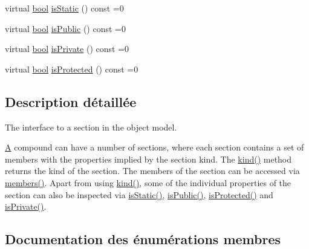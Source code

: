 \begin{DoxyCompactItemize}
\item 
virtual \hyperlink{qglobal_8h_a1062901a7428fdd9c7f180f5e01ea056}{bool} \hyperlink{class_i_section_aff6aeaf9972edac9b11fe09d74e58c5d}{is\+Static} () const  =0
\item 
virtual \hyperlink{qglobal_8h_a1062901a7428fdd9c7f180f5e01ea056}{bool} \hyperlink{class_i_section_aac1342e8d3db6be3fb5dada6a06bcdb3}{is\+Public} () const  =0
\item 
virtual \hyperlink{qglobal_8h_a1062901a7428fdd9c7f180f5e01ea056}{bool} \hyperlink{class_i_section_a5a55533e4ac46cd3acf226b80452faaf}{is\+Private} () const  =0
\item 
virtual \hyperlink{qglobal_8h_a1062901a7428fdd9c7f180f5e01ea056}{bool} \hyperlink{class_i_section_ad883e4145d8cf50b8fdcb97266845e8d}{is\+Protected} () const  =0
\end{DoxyCompactItemize}


\subsection{Description détaillée}
The interface to a section in the object model. 

\hyperlink{class_a}{A} compound can have a number of sections, where each section contains a set of members with the properties implied by the section kind. The \hyperlink{class_i_section_aea5541b95f6c5b50fd3cad5794b34d47}{kind()} method returns the kind of the section. The members of the section can be accessed via \hyperlink{class_i_section_a37b0fa3669f435713058ca5c7b377e3a}{members()}. Apart from using \hyperlink{class_i_section_aea5541b95f6c5b50fd3cad5794b34d47}{kind()}, some of the individual properties of the section can also be inspected via \hyperlink{class_i_section_aff6aeaf9972edac9b11fe09d74e58c5d}{is\+Static()}, \hyperlink{class_i_section_aac1342e8d3db6be3fb5dada6a06bcdb3}{is\+Public()}, \hyperlink{class_i_section_ad883e4145d8cf50b8fdcb97266845e8d}{is\+Protected()} and \hyperlink{class_i_section_a5a55533e4ac46cd3acf226b80452faaf}{is\+Private()}. 

\subsection{Documentation des énumérations membres}
\hypertarget{class_i_section_af768cbfe7056fadbd0a67d26d0ef84e5}{}
